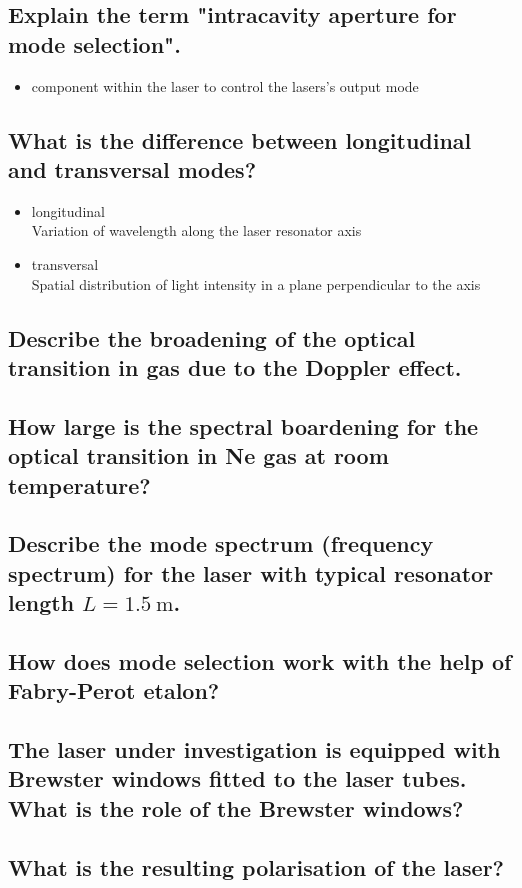 \subsection{Explain the term "intracavity aperture for mode selection".}
\begin{itemize}
    \item component within the laser to control the lasers's output mode
\end{itemize}
\subsection{What is the difference between longitudinal and transversal modes?}
\begin{itemize}
    \item longitudinal \\
    \to Variation of wavelength along the laser resonator axis
    \item transversal \\
    \to Spatial distribution of light intensity in a plane perpendicular to the axis
\end{itemize}

\subsection{Describe the broadening of the optical transition in gas due to the Doppler effect.}
\subsection{How large is the spectral boardening for the optical transition in 
Ne gas at room temperature?}
\subsection{Describe the mode spectrum (frequency spectrum) for the laser with 
typical resonator length $L=\SI{1.5}{\meter}$.}
\subsection{How does mode selection work with the help of Fabry-Perot etalon?}

\subsection{The laser under investigation is equipped with Brewster windows fitted
to the laser tubes. What is the role of the Brewster windows?}
\subsection{What is the resulting polarisation of the laser?}